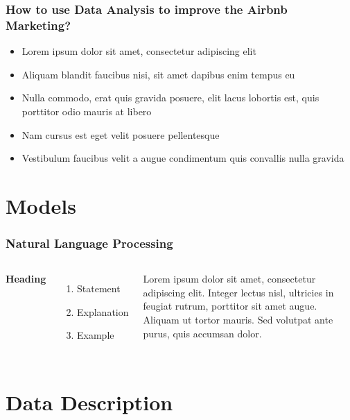 \documentclass{beamer}
\begin{document}

\begin{frame}
\frametitle{How to use Data Analysis to improve the Airbnb Marketing?}
\begin{itemize}
\item Lorem ipsum dolor sit amet, consectetur adipiscing elit
\item Aliquam blandit faucibus nisi, sit amet dapibus enim tempus eu
\item Nulla commodo, erat quis gravida posuere, elit lacus lobortis est, quis porttitor odio mauris at libero
\item Nam cursus est eget velit posuere pellentesque
\item Vestibulum faucibus velit a augue condimentum quis convallis nulla gravida
\end{itemize}
\end{frame}

\section{Models}

\begin{frame}
\frametitle{Natural Language Processing}
\begin{columns}[c] %

\textbf{Heading}
\begin{enumerate}
\item Statement
\item Explanation
\item Example
\end{enumerate}

Lorem ipsum dolor sit amet, consectetur adipiscing elit. Integer lectus nisl, ultricies in feugiat rutrum, porttitor sit amet augue. Aliquam ut tortor mauris. Sed volutpat ante purus, quis accumsan dolor.

\end{columns}
\end{frame}



\section{Data Description}
\end{document}
